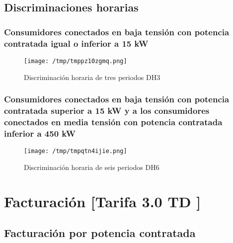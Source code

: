 \documentclass[a4paper,10pt]{article}
\begin{document}
\begin{Form}
 

\subsection{Discriminaciones horarias}
\subsubsection{Consumidores conectados en baja tensión con potencia contratada igual o inferior a 15 kW}

\begin{figure}[H] \centering
                    
                    \texttt{[image: /tmp/tmppz10zgmq.png]}
                    \caption{Discriminación horaria de tres periodos DH3}
                    
                    \label{fig:dfassssdfsa}
                    \end{figure}
                    


\subsubsection{Consumidores conectados en baja tensión con potencia contratada superior a 15 kW y a los consumidores conectados en media tensión con potencia contratada inferior a 450 kW}

\begin{figure}[H] \centering
                    
                    \texttt{[image: /tmp/tmpqtn4ijie.png]}
                    \caption{Discriminación horaria de seis periodos DH6}
                    
                    \label{fig:dfassssdfsa}
                    \end{figure}
                    












\section{Facturación [Tarifa 3.0 TD ]}
\subsection{Facturación por potencia contratada}


\end{Form}
\end{document}
